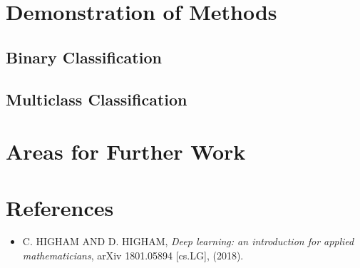 \documentclass{article}
\begin{document}
        
        
        
        
        






\section{Demonstration of Methods}

    \subsection{Binary Classification}
    
    \subsection{Multiclass Classification}
    



\section{Areas for Further Work}    




\section*{References}

	\begin{itemize}
	
		\item[] C. HIGHAM AND D. HIGHAM, \textit{Deep learning: an introduction for applied mathematicians}, arXiv 1801.05894 [cs.LG], (2018).

	\end{itemize}
\end{document}
